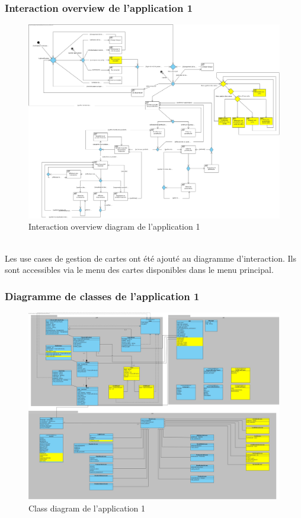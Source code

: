 \documentclass[../rapport.tex]{subfiles}
\begin{document}
\subsubsection{Interaction overview de l'application 1}
	\begin{figure}[h!]
		\centering\includegraphics[scale=0.15]{ressources/photos_diagrammes/extensionTheo/diagrams1/InteractionOverviewDiagram1.jpg}
		\caption{Interaction overview diagram de l'application 1}
	\end{figure}\\

Les use cases de gestion de cartes ont été ajouté au diagramme d'interaction.
Ils sont accessibles via le menu des cartes disponibles dans le menu principal.\\

\subsubsection{Diagramme de classes de l'application 1}
	\begin{figure}[h!]
		\centering\includegraphics[scale=0.15]{ressources/photos_diagrammes/extensionTheo/diagrams1/classDiagram1.jpg}
		\caption{Class diagram de l'application 1}
	\end{figure}
\end{document}
